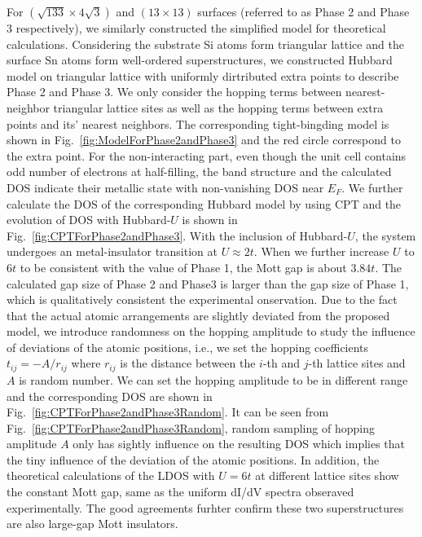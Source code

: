 \documentclass[aps,prb,reprint,amsfonts,amsmath,amssymb,showpacs,groupedaddress,superscriptaddress]{revtex4-1}
\begin{document}
For $(\sqrt{133} \times 4\sqrt{3})$ and $(13 \times 13)$ surfaces (referred to as Phase 2 and Phase 3 respectively), we similarly constructed the simplified model for theoretical calculations. Considering the substrate Si atoms form triangular lattice and the surface Sn atoms form well-ordered superstructures, we constructed Hubbard model on triangular lattice with uniformly dirtributed extra points to describe Phase 2 and Phase 3. We only consider the hopping terms between nearest-neighbor triangular lattice sites as well as the hopping terms between extra points and its' nearest neighbors. The corresponding tight-bingding model is shown in Fig.~\ref{fig:ModelForPhase2andPhase3} and the red circle correspond to the extra point. For the non-interacting part, even though the unit cell contains odd number of electrons at half-filling, the band structure and the calculated DOS indicate their metallic state with non-vanishing DOS near $E_{F}$. We further calculate the DOS of the corresponding Hubbard model by using CPT and the evolution of DOS with Hubbard-$U$ is shown in Fig.~\ref{fig:CPTForPhase2andPhase3}. With the inclusion of Hubbard-$U$, the system undergoes an metal-insulator transition at $U \approx 2t$. When we further increase $U$ to $6t$ to be consistent with the value of Phase 1, the Mott gap is about $3.84t$. The calculated gap size of
Phase 2 and Phase3 is larger than the gap size of Phase 1, which is qualitatively consistent the experimental onservation. Due to the fact that the actual atomic arrangements are slightly deviated from the proposed model, we introduce randomness on the hopping amplitude to study the influence of deviations of the atomic positions, i.e., we set the hopping coefficients $t_{ij} = -A / r_{ij}$ where $r_{ij}$ is the distance between the $i$-th and $j$-th lattice sites and $A$ is random number. We can set the hopping amplitude to be in different range and the corresponding DOS are shown in Fig.~\ref{fig:CPTForPhase2andPhase3Random}. It can be seen from Fig.~\ref{fig:CPTForPhase2andPhase3Random}, random sampling of hopping amplitude $A$ only has sightly influence on the resulting DOS which implies that the tiny influence of the deviation of the atomic positions. In addition, the theoretical calculations of the LDOS with $U = 6t$ at different lattice sites show the constant Mott gap, same as the uniform dI/dV spectra obseraved experimentally. The good agreements furhter confirm these two superstructures are also large-gap Mott insulators.
\end{document}
